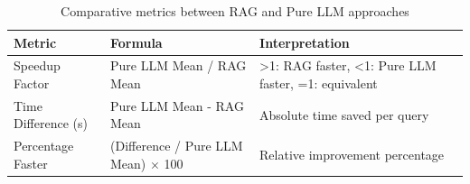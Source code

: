 \begin{table}[H]
  \centering
  \begin{tabular}{|l|>{\raggedright\arraybackslash}p{}|>{\raggedright\arraybackslash}p{}|}
    \hline
    \textbf{Metric} & \textbf{Formula} & \textbf{Interpretation} \\
    \hline
    Speedup Factor & Pure LLM Mean / RAG Mean & >1: RAG faster, <1: Pure LLM faster, =1: equivalent \\
    \hline
    Time Difference (s) & Pure LLM Mean - RAG Mean & Absolute time saved per query \\
    \hline
    Percentage Faster & (Difference / Pure LLM Mean) $\times$ 100 & Relative improvement percentage \\
    \hline
  \end{tabular}
  \caption{Comparative metrics between RAG and Pure LLM approaches}
  \label{tab:comparative-metrics}
\end{table}
